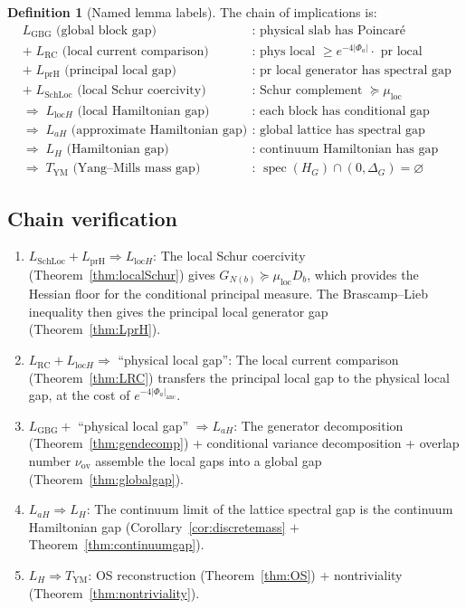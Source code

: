 \documentclass[12pt]{article}
\theoremstyle{plain}
\theoremstyle{definition}
\newtheorem{definition}[theorem]{Definition}
\numberwithin{equation}{section}
\newcommand{\spec}{\operatorname{spec}}
\newcommand{\loc}{\mathrm{loc}}
\newcommand{\ov}{\mathrm{ov}}
\begin{document}
\begin{definition}[Named lemma labels]
The chain of implications is:
\begin{align}
&L_{\mathrm{GBG}}\text{ (global block gap)} &&\text{: physical slab has Poincar\'e inequality}\\
&+\; L_{\mathrm{RC}}\text{ (local current comparison)} &&\text{: phys local }\geq e^{-4|\Phi_a|}\cdot\text{ pr local}\\
&+\; L_{\mathrm{prH}}\text{ (principal local gap)} &&\text{: pr local generator has spectral gap}\\
&+\; L_{\mathrm{SchLoc}}\text{ (local Schur coercivity)} &&\text{: Schur complement }\succeq\mu_{\loc}\\
&\Longrightarrow\; L_{\loc H}\text{ (local Hamiltonian gap)} &&\text{: each block has conditional gap}\\
&\Longrightarrow\; L_{aH}\text{ (approximate Hamiltonian gap)} &&\text{: global lattice has spectral gap}\\
&\Longrightarrow\; L_H\text{ (Hamiltonian gap)} &&\text{: continuum Hamiltonian has gap}\\
&\Longrightarrow\; T_{\mathrm{YM}}\text{ (Yang--Mills mass gap)} &&\text{: }\spec(H_G)\cap(0,\Delta_G)=\varnothing
\end{align}
\end{definition}

\subsection{Chain verification}

\begin{enumerate}[label=\textbf{Link \arabic*.}]
\item $L_{\mathrm{SchLoc}}+L_{\mathrm{prH}}\Rightarrow L_{\loc H}$:
The local Schur coercivity (Theorem~\ref{thm:localSchur}) gives $G_{N(b)}\succeq\mu_{\loc} D_b$, which provides the Hessian floor for the conditional principal measure.  The Brascamp--Lieb inequality then gives the principal local generator gap (Theorem~\ref{thm:LprH}).

\item $L_{\mathrm{RC}}+L_{\loc H}\Rightarrow$ ``physical local gap'':
The local current comparison (Theorem~\ref{thm:LRC}) transfers the principal local gap to the physical local gap, at the cost of $e^{-4|\Phi_a|_{\mathrm{anc}}}$.

\item $L_{\mathrm{GBG}}+$ ``physical local gap'' $\Rightarrow L_{aH}$:
The generator decomposition (Theorem~\ref{thm:gendecomp}) + conditional variance decomposition + overlap number $\nu_{\ov}$ assemble the local gaps into a global gap (Theorem~\ref{thm:globalgap}).

\item $L_{aH}\Rightarrow L_H$:
The continuum limit of the lattice spectral gap is the continuum Hamiltonian gap (Corollary~\ref{cor:discretemass} $+$ Theorem~\ref{thm:continuumgap}).

\item $L_H\Rightarrow T_{\mathrm{YM}}$:
OS reconstruction (Theorem~\ref{thm:OS}) + nontriviality (Theorem~\ref{thm:nontriviality}).
\end{enumerate}
\end{document}
